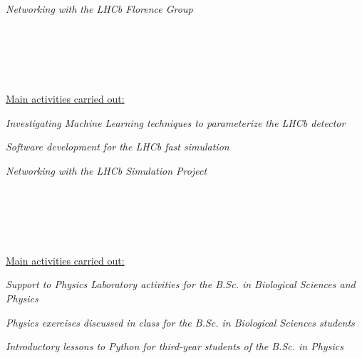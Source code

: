 \begin{cvcontent}
{\begin{itemize*}[label=\textcolor{iconcolor}{\textbullet}]
    \item \emph{Networking with the LHCb Florence Group}
  \end{itemize*}}
  \\ [4mm]
  \\ [0.5mm]
  \\ [1.5mm]
  \\ [1.5mm]
  {\normalsize \color{maincolor} \ul{Main activities carried out:}\\ [1.5mm]
  \begin{itemize*}[label=\textcolor{iconcolor}{\textbullet}]
    \item \emph{Investigating Machine Learning techniques to 
      parameterize the LHCb detector}\\ [0.5mm]
    \item \emph{Software development for the LHCb fast simulation}\\ [0.5mm]
    \item \emph{Networking with the LHCb Simulation Project}
  \end{itemize*}}
  \\ [4mm]
  \\ [0.5mm]
  \\ [1.5mm]
  \\ [1.5mm]
  {\normalsize \color{maincolor} \ul{Main activities carried out:}\\ [1.5mm]
  \begin{itemize*}[label=\textcolor{iconcolor}{\textbullet}]
    \item \emph{Support to Physics Laboratory activities for 
      the B.Sc. in Biological Sciences and Physics}\\ [0.5mm]
    \item \emph{Physics exercises discussed in class for the 
      B.Sc. in Biological Sciences students}\\ [0.5mm]
    \item \emph{Introductory lessons to Python for third-year 
      students of the B.Sc. in Physics}
  \end{itemize*}}

\end{cvcontent}
